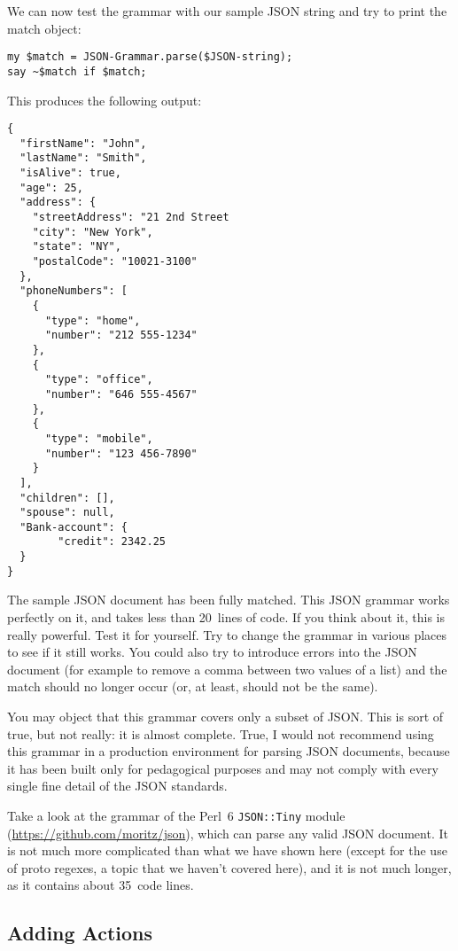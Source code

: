 We can now test the grammar with our sample JSON string 
and try to print the match object:

\begin{verbatim}
my $match = JSON-Grammar.parse($JSON-string);
say ~$match if $match;
\end{verbatim}

This produces the following output:

\begin{verbatim}
{
  "firstName": "John",
  "lastName": "Smith",
  "isAlive": true,
  "age": 25,
  "address": {
    "streetAddress": "21 2nd Street
    "city": "New York",
    "state": "NY",
    "postalCode": "10021-3100"
  },
  "phoneNumbers": [
    {
      "type": "home",
      "number": "212 555-1234"
    },
    {
      "type": "office",
      "number": "646 555-4567"
    },
    {
      "type": "mobile",
      "number": "123 456-7890"
    }
  ],
  "children": [],
  "spouse": null,
  "Bank-account": {
        "credit": 2342.25
  }
}
\end{verbatim}

The sample JSON document has been fully matched. This 
JSON grammar works perfectly on it, and takes less than 
20~lines of code. If you think about it, this is 
really powerful. Test it for yourself. Try to change 
the grammar in various places to see if it still works. 
You could also try to introduce errors into the JSON 
document (for example to remove a comma between two values 
of a list) and the match should no longer occur (or, at least, 
should not be the same).

You may object that this grammar covers only a subset 
of JSON. This is sort of true, but not really: it is almost complete. 
True, I would not recommend using this grammar 
in a production environment for parsing JSON documents, 
because it has been built only for pedagogical purposes 
and may not comply with every single fine detail of the JSON 
standards.

Take a look at the grammar of the Perl~6 {\tt JSON::Tiny} 
module (\url{https://github.com/moritz/json}), which can 
parse any valid JSON document. It is not much more 
complicated than what we have shown here (except for the use 
of proto regexes, a topic that we haven't covered here), and 
it is not much longer, as it contains about 35~code lines.

\subsection{Adding Actions}

